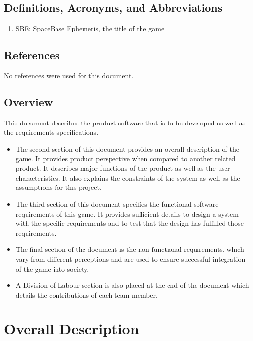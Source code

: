\documentclass[]{article}
\begin{document}
\subsection{Definitions, Acronyms, and Abbreviations}
\label{sub:definitions_acronyms_and_abbreviations}
\begin{enumerate}
	\item SBE: SpaceBase Ephemeris, the title of the game
\end{enumerate}

\subsection{References}
\label{sub:references}
	No references were used for this document.

\subsection{Overview}
\label{sub:overview}
	This document describes the product software that is to be developed as well as the requirements specifications.
\begin{itemize}
	\item The second section of this document provides an overall description of the game. It provides product perspective when compared to another related product. It describes major functions of the product as well as the user characteristics. It also explains the constraints of the system as well as the assumptions for this project.
	\item The third section of this document specifies the functional software requirements of this game. It provides sufficient details to design a system with the specific requirements and to test that the design has fulfilled those requirements. 
	\item The final section of the document is the non-functional requirements, which vary from different perceptions and are used to ensure successful integration of the game into society.
	\item A Division of Labour section is also placed at the end of the document which details the contributions of each team member.
\end{itemize}


\section{Overall Description}
\label{sec:overall_description}
\end{document}
